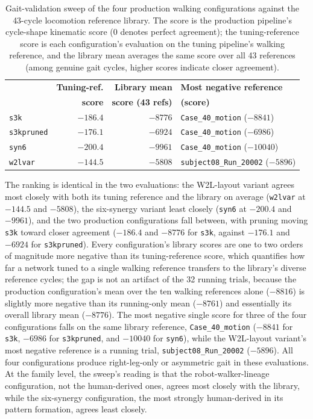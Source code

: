 \begin{table}[htbp]
\caption{Gait-validation sweep of the four production walking configurations against the 43-cycle locomotion reference library. The score is the production pipeline's cycle-shape kinematic score (0 denotes perfect agreement); the tuning-reference score is each configuration's evaluation on the tuning pipeline's walking reference, and the library mean averages the same score over all 43 references (among genuine gait cycles, higher scores indicate closer agreement).}
\label{tab:gait_sweep}
\begin{tabular}{@{}lrrl@{}}
\toprule
 & \textbf{Tuning-ref.} & \textbf{Library mean} & \textbf{Most negative reference} \\
 & \textbf{score} & \textbf{score (43 refs)} & \textbf{(score)} \\
\midrule
\texttt{s3k}        & $-186.4$ & $-8776$ & \texttt{Case\_40\_motion} ($-8841$) \\
\texttt{s3kpruned}  & $-176.1$ & $-6924$ & \texttt{Case\_40\_motion} ($-6986$) \\
\texttt{syn6}       & $-200.4$ & $-9961$ & \texttt{Case\_40\_motion} ($-10040$) \\
\texttt{w2lvar}     & $-144.5$ & $-5808$ & \texttt{subject08\_Run\_20002} ($-5896$) \\
\bottomrule
\end{tabular}
\end{table}

The ranking is identical in the two evaluations: the W2L-layout variant agrees most closely with both its tuning reference and the library on average (\texttt{w2lvar} at $-144.5$ and $-5808$), the six-synergy variant least closely (\texttt{syn6} at $-200.4$ and $-9961$), and the two production configurations fall between, with pruning moving \texttt{s3k} toward closer agreement ($-186.4$ and $-8776$ for \texttt{s3k}, against $-176.1$ and $-6924$ for \texttt{s3kpruned}). Every configuration's library scores are one to two orders of magnitude more negative than its tuning-reference score, which quantifies how far a network tuned to a single walking reference transfers to the library's diverse reference cycles; the gap is not an artifact of the 32 running trials, because the production configuration's mean over the ten walking references alone ($-8816$) is slightly more negative than its running-only mean ($-8761$) and essentially its overall library mean ($-8776$). The most negative single score for three of the four configurations falls on the same library reference, \texttt{Case\_40\_motion} ($-8841$ for \texttt{s3k}, $-6986$ for \texttt{s3kpruned}, and $-10040$ for \texttt{syn6}), while the W2L-layout variant's most negative reference is a running trial, \texttt{subject08\_Run\_20002} ($-5896$). All four configurations produce right-leg-only or asymmetric gait in these evaluations. At the family level, the sweep's reading is that the robot-walker-lineage configuration, not the human-derived ones, agrees most closely with the library, while the six-synergy configuration, the most strongly human-derived in its pattern formation, agrees least closely.

